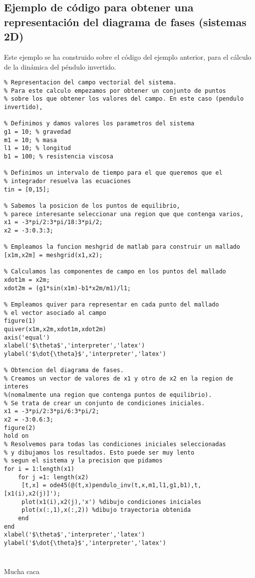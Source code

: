\section[diagramas de fase para sistemas 2D]{Ejemplo de código para obtener una representación del diagrama de fases (sistemas 2D)}\label{AVdP}

Este ejemplo se ha construido sobre el código del ejemplo anterior, para el cálculo de la dinámica del péndulo invertido.

\begin{lstlisting}
% Representacion del campo vectorial del sistema. 
% Para este calculo empezamos por obtener un conjunto de puntos
% sobre los que obtener los valores del campo. En este caso (pendulo invertido), 

% Definimos y damos valores los parametros del sistema
g1 = 10; % gravedad
m1 = 10; % masa
l1 = 10; % longitud
b1 = 100; % resistencia viscosa

% Definimos un intervalo de tiempo para el que queremos que el
% integrador resuelva las ecuaciones
tin = [0,15];

% Sabemos la posicion de los puntos de equilibrio, 
% parece interesante seleccionar una region que que contenga varios,
x1 = -3*pi/2:3*pi/18:3*pi/2;
x2 = -3:0.3:3;

% Empleamos la funcion meshgrid de matlab para construir un mallado
[x1m,x2m] = meshgrid(x1,x2);

% Calculamos las componentes de campo en los puntos del mallado
xdot1m = x2m; 
xdot2m = (g1*sin(x1m)-b1*x2m/m1)/l1;

% Empleamos quiver para representar en cada punto del mallado
% el vector asociado al campo 
figure(1)
quiver(x1m,x2m,xdot1m,xdot2m)
axis('equal')
xlabel('$\theta$','interpreter','latex')
ylabel('$\dot{\theta}$','interpreter','latex')

% Obtencion del diagrama de fases.
% Creamos un vector de valores de x1 y otro de x2 en la region de interes
%(nomalmente una region que contenga puntos de equilibrio).
% Se trata de crear un conjunto de condiciones iniciales.
x1 = -3*pi/2:3*pi/6:3*pi/2;
x2 = -3:0.6:3;
figure(2)
hold on
% Resolvemos para todas las condiciones iniciales seleccionadas
% y dibujamos los resultados. Esto puede ser muy lento
% segun el sistema y la precision que pidamos
for i = 1:length(x1)
    for j =1: length(x2)
     [t,x] = ode45(@(t,x)pendulo_inv(t,x,m1,l1,g1,b1),t,[x1(i),x2(j)]');
     plot(x1(i),x2(j),'x') %dibujo condiciones iniciales
     plot(x(:,1),x(:,2)) %dibujo trayectoria obtenida 
    end
end
xlabel('$\theta$','interpreter','latex')
ylabel('$\dot{\theta}$','interpreter','latex')

\end{lstlisting}
\chapter{}
Mucha caca